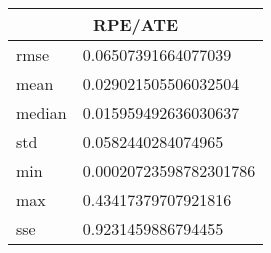 \begin{table}[!ht] 
 \centering 
 \begin{tabular}{|l|l|} \hline 
 \multicolumn{2}{|c|}{RPE/ATE} \\ \hline 
 rmse & 0.06507391664077039 \\ \hline 
mean & 0.029021505506032504 \\ \hline 
median & 0.015959492636030637 \\ \hline 
std & 0.0582440284074965 \\ \hline 
min & 0.00020723598782301786 \\ \hline 
max & 0.43417379707921816 \\ \hline 
sse & 0.9231459886794455 \\ \hline 
\end{tabular} 
 \end{table}